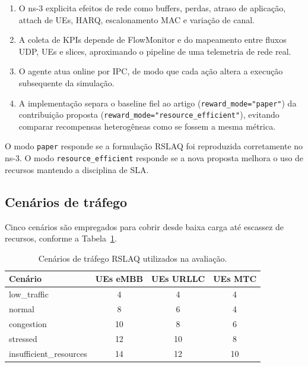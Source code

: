 \documentclass[10pt,a4paper]{IEEEtran}
\begin{document}
\begin{enumerate}
\item O ns-3 explicita efeitos de rede como buffers, perdas,
  atraso de aplica\c{c}\~{a}o, attach de UEs, HARQ,
  escalonamento MAC e varia\c{c}\~{a}o de canal.
\item A coleta de KPIs depende de FlowMonitor e do mapeamento
  entre fluxos UDP, UEs e slices, aproximando o pipeline de uma
  telemetria de rede real.
\item O agente atua online por IPC, de modo que cada a\c{c}\~{a}o
  altera a execu\c{c}\~{a}o subsequente da simula\c{c}\~{a}o.
\item A implementa\c{c}\~{a}o separa o baseline fiel ao artigo
  (\texttt{reward\_mode="paper"}) da contribui\c{c}\~{a}o
  proposta (\texttt{reward\_mode="resource\_efficient"}),
  evitando comparar recompensas heterog\^{e}neas como se fossem
  a mesma m\'{e}trica.
\end{enumerate}

O modo \texttt{paper} responde se a formula\c{c}\~{a}o RSLAQ foi
reproduzida corretamente no ns-3. O modo
\texttt{resource\_efficient} responde se a nova proposta melhora
o uso de recursos mantendo a disciplina de SLA.

\subsection{Cen\'{a}rios de tr\'{a}fego}

Cinco cen\'{a}rios s\~{a}o empregados para cobrir desde baixa
carga at\'{e} escassez de recursos, conforme a Tabela~\ref{tab:scenarios}.

\begin{table}[t]
\centering
\caption{Cen\'{a}rios de tr\'{a}fego RSLAQ utilizados na
         avalia\c{c}\~{a}o.}
\label{tab:scenarios}
\begin{tabular}{lccc}
\toprule
Cen\'{a}rio        & UEs eMBB & UEs URLLC & UEs MTC \\
\midrule
low\_traffic       & 4  & 4  & 4  \\
normal             & 8  & 6  & 4  \\
congestion         & 10 & 8  & 6  \\
stressed           & 12 & 10 & 8  \\
insufficient\_resources & 14 & 12 & 10 \\
\bottomrule
\end{tabular}
\end{table}
\end{document}
